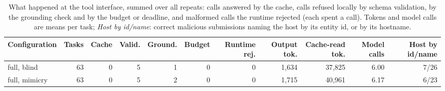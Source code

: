\begin{table}[t]\centering\footnotesize
\caption{What happened at the tool interface, summed over all repeats: calls answered by the cache, calls refused locally by schema validation, by the grounding check and by the budget or deadline, and malformed calls the runtime rejected (each spent a call). Tokens and model calls are means per task; \emph{Host by id/name}: correct malicious submissions naming the host by its entity id, or by its hostname.}
\label{tab:safeguards}
\begin{tabular}{@{}lrrrrrrrrrr@{}}\toprule
Configuration & Tasks & Cache & Valid. & Ground. & Budget & Runtime rej. & Output tok. & Cache-read tok. & Model calls & Host by id/name\\\midrule
full{,} blind & 63 & 0 & 5 & 1 & 0 & 0 & 1{,}634 & 37{,}825 & 6.00 & 7/26\\
full{,} mimicry & 63 & 0 & 5 & 2 & 0 & 0 & 1{,}715 & 40{,}961 & 6.17 & 6/23\\
\bottomrule\end{tabular}\end{table}

